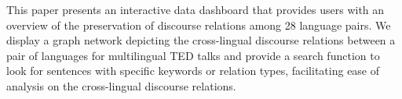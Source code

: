 This paper presents an interactive data dashboard that provides users with an overview of the preservation of discourse relations among 28 language pairs. We display a graph network depicting the cross-lingual discourse relations between a pair of languages for multilingual TED talks and provide a search function to look for sentences with specific keywords or relation types, facilitating ease of analysis on the cross-lingual discourse relations.
